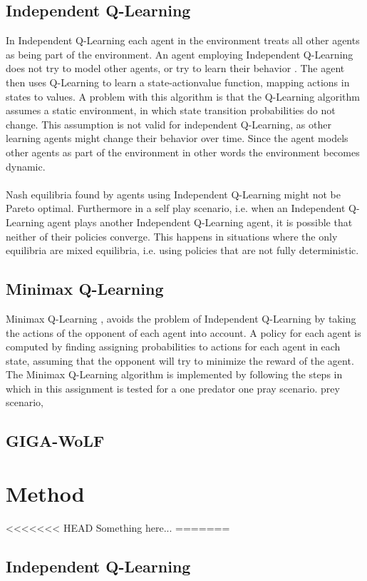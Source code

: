 \documentclass[a4paper,12pt]{article}
\begin{document}
\subsection{Independent Q-Learning}
In Independent Q-Learning each agent in the environment treats all other agents as being part of the environment. An agent employing Independent Q-Learning does not try to model other agents, or try to learn their behavior \cite{vlasis}. The agent then uses Q-Learning to learn a state-actionvalue function, mapping actions in states to values.
A problem with this algorithm is that the Q-Learning algorithm \cite{SB} assumes a static environment, in which state transition probabilities do not change. This assumption is not valid for independent Q-Learning, as other learning agents might change their behavior over time. Since the agent models other agents as part of the environment in other words the environment becomes dynamic.
\\ \\
Nash equilibria found by agents using Independent Q-Learning might not be Pareto optimal. Furthermore in a self play scenario, i.e. when an Independent Q-Learning agent plays another Independent Q-Learning agent, it is possible that neither of their policies converge. This happens in situations where the only equilibria are mixed equilibria, i.e. using policies that are not fully deterministic.

\subsection{Minimax Q-Learning}
Minimax Q-Learning \cite{minimax}, avoids the problem of Independent Q-Learning by taking the actions of the opponent of each agent into account. A policy for each agent is computed by finding assigning probabilities to actions for each agent in each state, assuming that the opponent will try to minimize the reward of the agent. 
The Minimax Q-Learning algorithm is implemented by following the steps in \cite{hk} which in this assignment is tested for a one predator one pray scenario.
prey scenario,
\subsection{GIGA-WoLF}
\section{Method}
<<<<<<< HEAD
Something here...
=======

\subsection{Independent Q-Learning}
\end{document}
